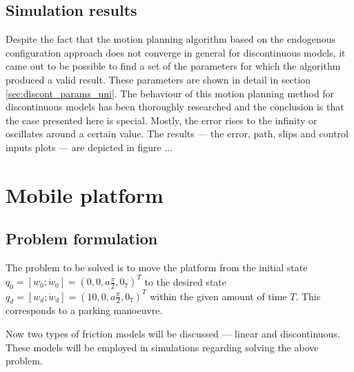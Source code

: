 \subsection{Simulation results}
Despite the fact that the motion planning algorithm based on the endogenous 
configuration approach does not converge in general for discontinuous models,
it came out to be possible to find a set of the parameters for which the algorithm produced
a valid result. These parameters are shown in detail in section \ref{sec:discont_params_uni}.
The behaviour of this motion planning method for discontinuous models has been thoroughly researched
and the conclusion is that the case presented here is special. Mostly, the error rises to the infinity
or oscillates around a certain value.
The results --- the error, path, slips and control inputs plots --- are depicted in figure ...


\section{Mobile platform}
\subsection{Problem formulation}
\label{sec:rex_task}
The problem to be solved is to move the platform from the initial state
$q_0 = [w_0; \dot{w}_0] = (0, 0, a\frac{\pi}{2}, 0_7)^T$ to the desired state
$q_d = [w_d; \dot{w}_d] = (10, 0, a\frac{\pi}{2}, 0_7)^T$
within the given amount of time $T$. 
This corresponds to a parking manoeuvre.

Now two types of friction models will be discussed --- linear
and discontinuous. These models will be employed in simulations
regarding solving the above problem.

